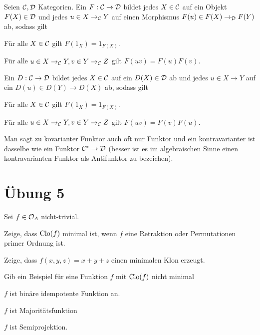 \documentclass{book}
\begin{document}
\begin{definition}
    Seien $\mathcal{C}, \mathcal{D}$ Kategorien. Ein  $F:\mathcal{C}\rightarrow\mathcal{D}$ bildet jedes $X\in \mathcal{C}$ auf ein Objekt $F(X)\in\mathcal{D}$ und jedes $u\in X\rightarrow_{\mathcal{C}}Y$ auf einen Morphismus $F(u)\in F(X)\rightarrow_{\mathcal{D}} F(Y)$ ab, sodass gilt
    \begin{properties}
            \item Für alle $X\in\mathcal{C}$ gilt $F(1_X)=1_{F(X)}$.
            \item Für alle $u\in X\rightarrow_{\mathcal{C}} Y, v\in Y\rightarrow_{\mathcal{C}} Z$ gilt $F(uv)=F(u)F(v)$.
    \end{properties}
    Ein  $D:\mathcal{C}\rightarrow \mathcal{D}$ bildet jedes $X\in \mathcal{C}$ auf ein $D(X)\in \mathcal{D}$ ab und jedes $u\in X\to Y$ auf ein $D(u)\in D(Y)\to D(X)$ ab, sodass gilt
    \begin{properties}
            \item Für alle $X\in\mathcal{C}$ gilt $F(1_X)=1_{F(X)}$.
            \item Für alle $u\in X\rightarrow_{\mathcal{C}} Y, v\in Y\rightarrow_{\mathcal{C}} Z$ gilt $F(uv)=F(v)F(u)$.
    \end{properties}
\end{definition}

\begin{remark}
    Man sagt zu kovarianter Funktor auch oft nur Funktor und ein kontravarianter ist dasselbe wie ein Funktor $\mathcal{C}^{\ast}\rightarrow\mathcal{D}$ (besser ist es im algebraischen Sinne einen kontravarianten Funktor als Antifunktor zu bezeichen).
\end{remark}

\section{Übung 5}

\begin{exercise}
    Sei $f\in\mathcal{O}_A$ nicht-trivial.
    \begin{tasks}
            \item Zeige, dass $\mathrm{Clo}(f)$ minimal ist, wenn $f$ eine Retraktion oder Permutationen primer Ordnung ist.
            \item Zeige, dass $f(x,y,z)=x+y+z$ einen minimalen Klon erzeugt.
            \item Gib ein Beispiel für eine Funktion $f$ mit $\mathrm{Clo}(f)$ nicht minimal
        \begin{tasks}
                \item $f$ ist binäre idempotente Funktion an.
                \item $f$ ist Majoritätsfunktion
                \item $f$ ist Semiprojektion.
        \end{tasks}
    \end{tasks}
\end{exercise}
\end{document}
